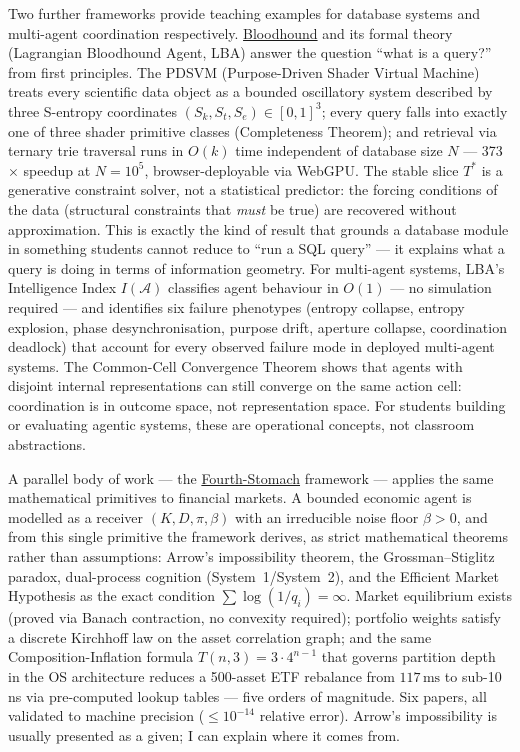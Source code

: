 \documentclass[12pt,a4paper]{article}
\begin{document}
Two further frameworks provide teaching examples for database systems and multi-agent
coordination respectively.
\href{https://github.com/fullscreen-triangle/bloodhound}{Bloodhound} and its formal
theory (Lagrangian Bloodhound Agent, LBA) answer the question ``what is a query?''
from first principles.
The PDSVM (Purpose-Driven Shader Virtual Machine) treats every scientific data
object as a bounded oscillatory system described by three S-entropy coordinates
$(S_k, S_t, S_e) \in [0,1]^3$; every query falls into exactly one of three shader
primitive classes (Completeness Theorem); and retrieval via ternary trie traversal
runs in $O(k)$ time independent of database size $N$ --- 373$\times$ speedup at
$N=10^5$, browser-deployable via WebGPU.
The stable slice $T^*$ is a generative constraint solver, not a statistical predictor:
the forcing conditions of the data (structural constraints that \emph{must} be true)
are recovered without approximation.
This is exactly the kind of result that grounds a database module in something students
cannot reduce to ``run a SQL query'' --- it explains what a query is doing in terms
of information geometry.
For multi-agent systems, LBA's Intelligence Index $I(\mathcal{A})$ classifies
agent behaviour in $O(1)$ --- no simulation required --- and identifies six failure
phenotypes (entropy collapse, entropy explosion, phase desynchronisation, purpose drift,
aperture collapse, coordination deadlock) that account for every observed failure mode
in deployed multi-agent systems. The Common-Cell Convergence Theorem shows that agents
with disjoint internal representations can still converge on the same action cell:
coordination is in outcome space, not representation space.
For students building or evaluating agentic systems, these are operational concepts,
not classroom abstractions.

A parallel body of work --- the \href{https://github.com/fullscreen-triangle/fourth-stomach}{Fourth-Stomach} framework ---
applies the same mathematical primitives to financial markets. A bounded economic agent
is modelled as a receiver $(K, D, \pi, \beta)$ with an irreducible noise floor
$\beta > 0$, and from this single primitive the framework derives, as strict
mathematical theorems rather than assumptions: Arrow's impossibility theorem,
the Grossman--Stiglitz paradox, dual-process cognition (System~1/System~2), and
the Efficient Market Hypothesis as the exact condition $\sum \log(1/q_i) = \infty$.
Market equilibrium exists (proved via Banach contraction, no convexity required);
portfolio weights satisfy a discrete Kirchhoff law on the asset correlation graph;
and the same Composition-Inflation formula $T(n,3) = 3 \cdot 4^{n-1}$ that governs
partition depth in the OS architecture reduces a 500-asset ETF rebalance from
$117\,\mathrm{ms}$ to sub-10\,ns via pre-computed lookup tables --- five orders of
magnitude. Six papers, all validated to machine precision ($\leq 10^{-14}$ relative
error). Arrow's impossibility is usually presented as a given; I can explain
where it comes from.
\end{document}
